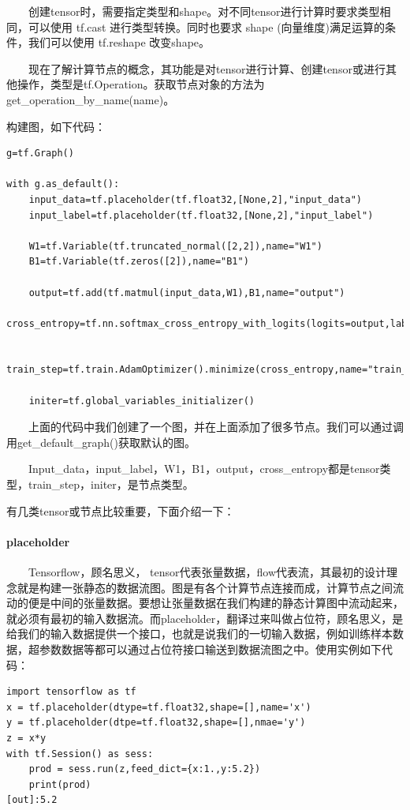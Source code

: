   创建tensor时，需要指定类型和shape。对不同tensor进行计算时要求类型相同，可以使用
tf.cast 进行类型转换。同时也要求 shape
(向量维度)满足运算的条件，我们可以使用 tf.reshape 改变shape。

  现在了解计算节点的概念，其功能是对tensor进行计算、创建tensor或进行其他操作，类型是tf.Operation。获取节点对象的方法为get\_operation\_by\_name(name)。

构建图，如下代码：

\begin{verbatim}
g=tf.Graph()

with g.as_default():
    input_data=tf.placeholder(tf.float32,[None,2],"input_data")
    input_label=tf.placeholder(tf.float32,[None,2],"input_label")

    W1=tf.Variable(tf.truncated_normal([2,2]),name="W1")
    B1=tf.Variable(tf.zeros([2]),name="B1")

    output=tf.add(tf.matmul(input_data,W1),B1,name="output")
    cross_entropy=tf.nn.softmax_cross_entropy_with_logits(logits=output,labels=input_label)

    train_step=tf.train.AdamOptimizer().minimize(cross_entropy,name="train_step")

    initer=tf.global_variables_initializer()
\end{verbatim}

  上面的代码中我们创建了一个图，并在上面添加了很多节点。我们可以通过调用get\_default\_graph()获取默认的图。

  Input\_data，input\_label，W1，B1，output，cross\_entropy都是tensor类型，train\_step，initer，是节点类型。

有几类tensor或节点比较重要，下面介绍一下：

\paragraph{placeholder}\label{placeholder}

  Tensorflow，顾名思义，
tensor代表张量数据，flow代表流，其最初的设计理念就是构建一张静态的数据流图。图是有各个计算节点连接而成，计算节点之间流动的便是中间的张量数据。要想让张量数据在我们构建的静态计算图中流动起来，就必须有最初的输入数据流。而placeholder，翻译过来叫做占位符，顾名思义，是给我们的输入数据提供一个接口，也就是说我们的一切输入数据，例如训练样本数据，超参数数据等都可以通过占位符接口输送到数据流图之中。使用实例如下代码：

\begin{verbatim}
import tensorflow as tf
x = tf.placeholder(dtype=tf.float32,shape=[],name='x')
y = tf.placeholder(dtpe=tf.float32,shape=[],nmae='y')
z = x*y
with tf.Session() as sess:
    prod = sess.run(z,feed_dict={x:1.,y:5.2})
    print(prod)
[out]:5.2
\end{verbatim}

